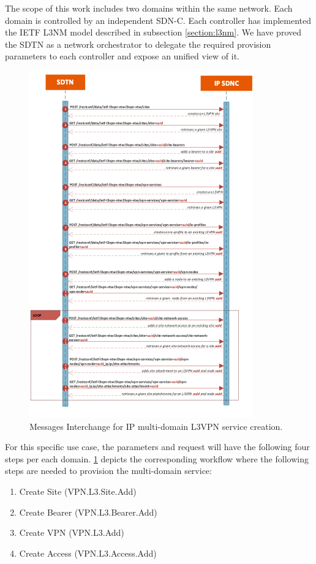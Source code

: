 \documentclass[a4paper,fleqn]{cas-dc}
\begin{document}
The scope of this work includes two domains within the same network. Each domain is controlled by an independent SDN-C. Each controller has implemented the IETF L3NM model described in subsection \cref{section:l3nm}. We have proved the SDTN as a network orchestrator to delegate the required provision parameters to each controller and expose an unified view of it.

\begin{figure}
	\centering
		\includegraphics[width=\linewidth]{figs/l3vpn_workflow.png}
	\caption{Messages Interchange for IP multi-domain L3VPN service creation.}
	\label{FIG:l3vpn_workflow}
\end{figure}

For this specific use case, the parameters and request will have the following four steps per each domain. \cref{FIG:l3vpn_workflow} depicts the corresponding workflow where the following steps are needed to provision the multi-domain service:
\begin{enumerate}
    \item Create Site (VPN.L3.Site.Add)
    \item Create Bearer (VPN.L3.Bearer.Add)
    \item Create VPN (VPN.L3.Add)
    \item Create Access (VPN.L3.Access.Add)
\end{enumerate}
\end{document}
